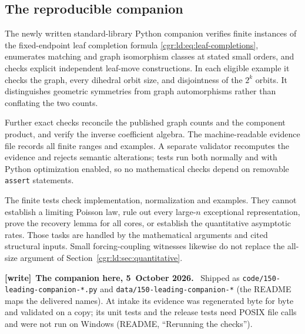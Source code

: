 \documentclass[11pt,letterpaper]{article}
\numberwithin{equation}{section}
\theoremstyle{definition}\newtheorem{definition}[theorem]{Definition}
\theoremstyle{remark}\newtheorem{remark}[theorem]{Remark}
\newcommand{\file}[1]{\nolinkurl{#1}}
\newenvironment{writenote}[1][]{\par\smallskip\begingroup\small
 \noindent\textbf{[write]}\if\relax\detokenize{#1}\relax\else~\textbf{#1.}\fi\ }%
 {\par\endgroup\smallskip}
\begin{document}
\subsection{The reproducible companion}\label{cgr:ld:sub:companion}
The newly written standard-library Python companion verifies
finite instances of the fixed-endpoint leaf completion formula
\eqref{cgr:ld:eq:leaf-completions}, enumerates matching and graph
isomorphism classes at stated small orders, and checks explicit
independent leaf-move constructions. In each eligible example it
checks the graph, every dihedral orbit size, and disjointness of
the $2^k$ orbits. It distinguishes geometric symmetries from graph
automorphisms rather than conflating the two counts.

Further exact checks reconcile the published graph counts and the
component product, and verify the inverse coefficient algebra.
The machine-readable evidence file records all finite ranges and
examples. A separate validator recomputes the evidence and rejects
semantic alterations; tests run both normally and with Python
optimization enabled, so no mathematical checks depend on
removable \texttt{assert} statements.

The finite tests check implementation, normalization and examples.
They cannot establish a limiting Poisson law, rule out every
large-$n$ exceptional representation, prove the recovery lemma
for all cores, or establish the quantitative asymptotic rates.
Those tasks are handled by the mathematical arguments and cited
structural inputs. Small forcing-coupling witnesses likewise do not
replace the all-size argument of Section~\ref{cgr:ld:sec:quantitative}.
\begin{writenote}[The companion here, 5~October 2026]
Shipped as \file{code/150-leading-companion-*.py} and \file{data/150-leading-companion-*} (the README maps the delivered names). At intake its evidence was regenerated byte for byte and validated on a copy; its unit tests and the release tests need POSIX file calls and were not run on Windows (README, ``Rerunning the checks'').
\end{writenote}
\end{document}
